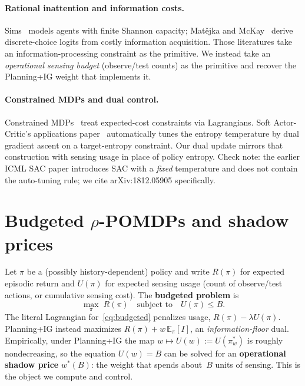 \documentclass[runningheads]{llncs}
\begin{document}
\paragraph{Rational inattention and information costs.}
Sims~\citep{sims2003} models agents with finite Shannon capacity; Mat\v{e}jka and McKay~\citep{matejka2015} derive discrete-choice logits from costly information acquisition. Those literatures take an information-processing constraint as the primitive. We instead take an \emph{operational sensing budget} (observe/test counts) as the primitive and recover the Planning+IG weight that implements it.

\paragraph{Constrained MDPs and dual control.}
Constrained MDPs~\citep{altman1999} treat expected-cost constraints via Lagrangians. Soft Actor-Critic's applications paper~\citep{haarnoja2018sac} automatically tunes the entropy temperature by dual gradient ascent on a target-entropy constraint. Our dual update mirrors that construction with sensing usage in place of policy entropy. Check note: the earlier ICML SAC paper introduces SAC with a \emph{fixed} temperature and does not contain the auto-tuning rule; we cite arXiv:1812.05905 specifically.

\section{Budgeted $\rho$-POMDPs and shadow prices}
\label{sec:theory}

Let $\pi$ be a (possibly history-dependent) policy and write $R(\pi)$ for expected episodic return and $U(\pi)$ for expected sensing usage (count of observe/test actions, or cumulative sensing cost). The \textbf{budgeted problem} is
\begin{equation}
\label{eq:budgeted}
\max_\pi \; R(\pi) \quad \text{subject to} \quad U(\pi) \le B.
\end{equation}
The literal Lagrangian for~\eqref{eq:budgeted} penalizes usage, $R(\pi)-\lambda U(\pi)$. Planning+IG instead maximizes $R(\pi)+w\,\mathbb{E}_\pi[I]$, an \emph{information-floor} dual. Empirically, under Planning+IG the map $w\mapsto U(w):=U(\pi^*_w)$ is roughly nondecreasing, so the equation $U(w)=B$ can be solved for an \textbf{operational shadow price} $w^*(B)$: the weight that spends about~$B$ units of sensing. This is the object we compute and control.
\end{document}
